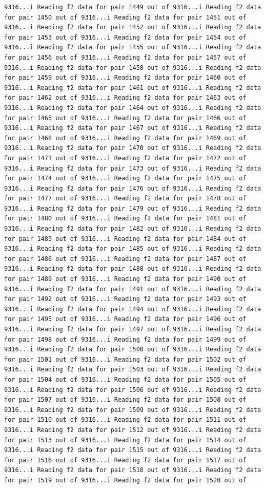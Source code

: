 \documentclass[
]{article}
\begin{document}
\begin{verbatim}
9316...i Reading f2 data for pair 1449 out of 9316...i Reading f2 data for pair 1450 out of 9316...i Reading f2 data for pair 1451 out of 9316...i Reading f2 data for pair 1452 out of 9316...i Reading f2 data for pair 1453 out of 9316...i Reading f2 data for pair 1454 out of 9316...i Reading f2 data for pair 1455 out of 9316...i Reading f2 data for pair 1456 out of 9316...i Reading f2 data for pair 1457 out of 9316...i Reading f2 data for pair 1458 out of 9316...i Reading f2 data for pair 1459 out of 9316...i Reading f2 data for pair 1460 out of 9316...i Reading f2 data for pair 1461 out of 9316...i Reading f2 data for pair 1462 out of 9316...i Reading f2 data for pair 1463 out of 9316...i Reading f2 data for pair 1464 out of 9316...i Reading f2 data for pair 1465 out of 9316...i Reading f2 data for pair 1466 out of 9316...i Reading f2 data for pair 1467 out of 9316...i Reading f2 data for pair 1468 out of 9316...i Reading f2 data for pair 1469 out of 9316...i Reading f2 data for pair 1470 out of 9316...i Reading f2 data for pair 1471 out of 9316...i Reading f2 data for pair 1472 out of 9316...i Reading f2 data for pair 1473 out of 9316...i Reading f2 data for pair 1474 out of 9316...i Reading f2 data for pair 1475 out of 9316...i Reading f2 data for pair 1476 out of 9316...i Reading f2 data for pair 1477 out of 9316...i Reading f2 data for pair 1478 out of 9316...i Reading f2 data for pair 1479 out of 9316...i Reading f2 data for pair 1480 out of 9316...i Reading f2 data for pair 1481 out of 9316...i Reading f2 data for pair 1482 out of 9316...i Reading f2 data for pair 1483 out of 9316...i Reading f2 data for pair 1484 out of 9316...i Reading f2 data for pair 1485 out of 9316...i Reading f2 data for pair 1486 out of 9316...i Reading f2 data for pair 1487 out of 9316...i Reading f2 data for pair 1488 out of 9316...i Reading f2 data for pair 1489 out of 9316...i Reading f2 data for pair 1490 out of 9316...i Reading f2 data for pair 1491 out of 9316...i Reading f2 data for pair 1492 out of 9316...i Reading f2 data for pair 1493 out of 9316...i Reading f2 data for pair 1494 out of 9316...i Reading f2 data for pair 1495 out of 9316...i Reading f2 data for pair 1496 out of 9316...i Reading f2 data for pair 1497 out of 9316...i Reading f2 data for pair 1498 out of 9316...i Reading f2 data for pair 1499 out of 9316...i Reading f2 data for pair 1500 out of 9316...i Reading f2 data for pair 1501 out of 9316...i Reading f2 data for pair 1502 out of 9316...i Reading f2 data for pair 1503 out of 9316...i Reading f2 data for pair 1504 out of 9316...i Reading f2 data for pair 1505 out of 9316...i Reading f2 data for pair 1506 out of 9316...i Reading f2 data for pair 1507 out of 9316...i Reading f2 data for pair 1508 out of 9316...i Reading f2 data for pair 1509 out of 9316...i Reading f2 data for pair 1510 out of 9316...i Reading f2 data for pair 1511 out of 9316...i Reading f2 data for pair 1512 out of 9316...i Reading f2 data for pair 1513 out of 9316...i Reading f2 data for pair 1514 out of 9316...i Reading f2 data for pair 1515 out of 9316...i Reading f2 data for pair 1516 out of 9316...i Reading f2 data for pair 1517 out of 9316...i Reading f2 data for pair 1518 out of 9316...i Reading f2 data for pair 1519 out of 9316...i Reading f2 data for pair 1520 out of 
\end{verbatim}
\end{document}
